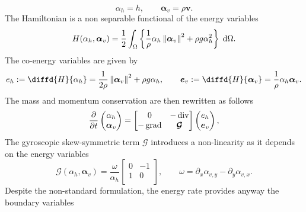 \begin{equation}\label{eq:alpha_shwater}
\alpha_h = h, \qquad \bm{\alpha}_v = \rho \bm{v}.
\end{equation}
The Hamiltonian is a non separable functional of the energy variables
\begin{equation}\label{eq:H_shwater}
H(\alpha_h, \bm{\alpha}_v) = \energy{\frac{1}{\rho} \alpha_h \norm{\bm{\alpha}_v}^2 + \rho g \alpha_h^2}.
\end{equation}
The co-energy variables are given by
\begin{equation}\label{eq:e_shwater}
e_h := \diffd{H}{\alpha_h} = \frac{1}{2 \rho} \norm{\bm{\alpha}_v}^2 + \rho g \alpha_h, \qquad \bm{e}_v := \diffd{H}{\bm{\alpha}_v} = \frac{1}{\rho} \alpha_h \bm{\alpha}_v.
\end{equation}
The mass and momentum conservation are then rewritten as follows
\begin{equation}\label{eq:pHsys_shwater}
\diffp{}{t}
\begin{pmatrix}
\alpha_h \\
\bm{\alpha}_v \\
\end{pmatrix} = 
\begin{bmatrix}
0 & -\div \\
-\grad & \bm{\mathcal{G}}
\end{bmatrix}
\begin{pmatrix}
e_h \\
\bm{e}_v \\
\end{pmatrix},
\end{equation}
The gyroscopic skew-symmetric term $\bm{\mathcal{G}}$ introduces a non-linearity as it depends on the energy variables
\begin{equation*}
\bm{\mathcal{G}}(\alpha_h, \bm{\alpha}_v) = \frac{\omega}{\alpha_h} \begin{bmatrix}
0 & -1 \\
1 & 0 \\
\end{bmatrix}, \qquad \omega = \partial_x \alpha_{v, y} - \partial_y \alpha_{v, x}.
\end{equation*}
Despite the non-standard formulation, the energy rate provides anyway the boundary variables
